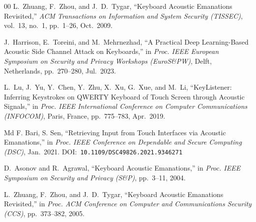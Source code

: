 \documentclass[conference]{IEEEtran}
\begin{document}
\begin{thebibliography}{00}
L.~Zhuang, F.~Zhou, and J.~D.~Tygar,
``Keyboard Acoustic Emanations Revisited,''
\textit{ACM Transactions on Information and System Security (TISSEC)},
vol.~13, no.~1, pp.~1--26, Oct.~2009.

J.~Harrison, E.~Toreini, and M.~Mehrnezhad,
``A Practical Deep Learning-Based Acoustic Side Channel Attack
on Keyboards,''
in \textit{Proc. IEEE European Symposium on Security and Privacy
Workshops (EuroS\&PW)},
Delft, Netherlands, pp.~270--280, Jul.~2023.

L.~Lu, J.~Yu, Y.~Chen, Y.~Zhu, X.~Xu, G.~Xue, and M.~Li,
``KeyListener: Inferring Keystrokes on QWERTY Keyboard of Touch
Screen through Acoustic Signals,''
in \textit{Proc. IEEE International Conference on Computer
Communications (INFOCOM)},
Paris, France, pp.~775--783, Apr.~2019.

Md F. Bari, S. Sen,
``Retrieving Input from Touch Interfaces via Acoustic Emanations,''
in \textit{Proc. IEEE Conference on Dependable and Secure
Computing (DSC)},
Jan.~2021.
DOI:~\texttt{10.1109/DSC49826.2021.9346271}

D.~Asonov and R.~Agrawal,
``Keyboard Acoustic Emanations,''
in \textit{Proc. IEEE Symposium on Security and Privacy (S\&P)},
pp.~3--11, 2004.

L.~Zhuang, F.~Zhou, and J.~D.~Tygar,
``Keyboard Acoustic Emanations Revisited,''
in \textit{Proc. ACM Conference on Computer and Communications
Security (CCS)},
pp.~373--382, 2005.





\end{thebibliography}
\end{document}
